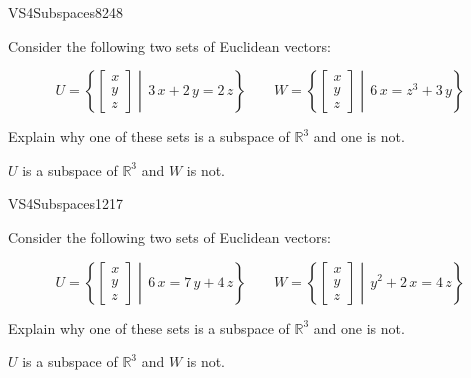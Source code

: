\begin{exercise}{VS4}{Subspaces}{8248} 
\begin{exerciseStatement} 

Consider the following two sets of Euclidean vectors: 

 \[
          U=\left\{ \left[\begin{array}{c}
x \\
y \\
z
\end{array}\right] \middle|\,3 \, x + 2 \, y = 2 \, z\right\} \hspace{2em}  W=\left\{ \left[\begin{array}{c}
x \\
y \\
z
\end{array}\right] \middle|\,6 \, x = z^{3} + 3 \, y\right\}
    \] 

 Explain why one of these sets is a subspace of \(\mathbb{R}^3\) and one is not. 

 \end{exerciseStatement}
 \begin{exerciseAnswer} 

\(U\) is a subspace of \(\mathbb{R}^3\) and \(W\) is not.

 \end{exerciseAnswer}
 \end{exercise}


\begin{exercise}{VS4}{Subspaces}{1217} 
\begin{exerciseStatement} 

Consider the following two sets of Euclidean vectors: 

 \[
          U=\left\{ \left[\begin{array}{c}
x \\
y \\
z
\end{array}\right] \middle|\,6 \, x = 7 \, y + 4 \, z\right\} \hspace{2em}  W=\left\{ \left[\begin{array}{c}
x \\
y \\
z
\end{array}\right] \middle|\,y^{2} + 2 \, x = 4 \, z\right\}
    \] 

 Explain why one of these sets is a subspace of \(\mathbb{R}^3\) and one is not. 

 \end{exerciseStatement}
 \begin{exerciseAnswer} 

\(U\) is a subspace of \(\mathbb{R}^3\) and \(W\) is not.

 \end{exerciseAnswer}
 \end{exercise}


